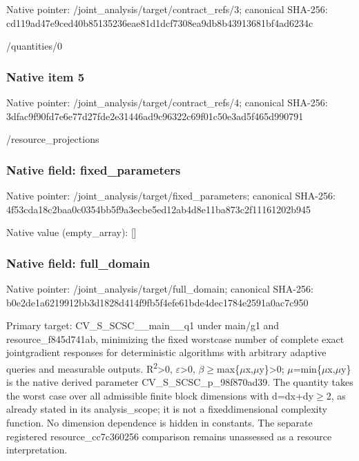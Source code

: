 \documentclass[10pt,a4paper]{article}
\begin{document}
Native pointer: /joint\_analysis/target/contract\_refs/3; canonical SHA-256: cd119ad47e9ced40b8513523\allowbreak{}6eae81d1dcf7308ea9db8b43\allowbreak{}913681bf4ad6234c


/quantities/0


\subsubsection{Native item 5}


Native pointer: /joint\_analysis/target/contract\_refs/4; canonical SHA-256: 3dfac9f90fd7e6e77d27fde2\allowbreak{}e31446ad9c96322c69f01c50\allowbreak{}e3ad5f465d990791


/resource\_projections


\subsubsection{Native field: fixed\_parameters}


Native pointer: /joint\_analysis/target/fixed\_parameters; canonical SHA-256: 4f53cda18c2baa0c0354bb5f\allowbreak{}9a3ecbe5ed12ab4d8e11ba87\allowbreak{}3c2f11161202b945



Native value (empty\_array): []



\subsubsection{Native field: full\_domain}


Native pointer: /joint\_analysis/target/full\_domain; canonical SHA-256: b0e2de1a6219912bb3d1828d\allowbreak{}414f9fb5f4efe61bde4dec17\allowbreak{}84e2591a0ac7c950


Primary target: CV\_S\_SCSC\_\_main\_\_q1 under main/g1 and resource\_f845d741ab, minimizing the fixed worstcase number of complete exact jointgradient responses for deterministic algorithms with arbitrary adaptive queries and measurable outputs. R\textsuperscript{2}>0, \ensuremath{\varepsilon}>0, \ensuremath{\beta}\ensuremath{\ge}max\{\ensuremath{\mu}x,\ensuremath{\mu}y\}>0; \ensuremath{\mu}=min\{\ensuremath{\mu}x,\ensuremath{\mu}y\} is the native derived parameter CV\_S\_SCSC\_p\_98f870ad39. The quantity takes the worst case over all admissible finite block dimensions with d=dx+dy\ensuremath{\ge}2, as already stated in its analysis\_scope; it is not a fixeddimensional complexity function. No dimension dependence is hidden in constants. The separate registered resource\_cc7c360256 comparison remains unassessed as a resource interpretation.
\end{document}
